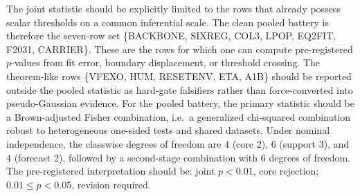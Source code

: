 \documentclass[11pt]{article}
\begin{document}
The joint statistic should be explicitly limited to the rows that already
possess scalar thresholds on a common inferential scale. The clean pooled
battery is therefore the seven-row set
\{BACKBONE, SIXREG, COL3, LPOP, EQ2FIT, F2031, CARRIER\}. These are the
rows for which one can compute pre-registered $p$-values from fit error,
boundary displacement, or threshold crossing. The theorem-like rows
\{VFEXO, HUM, RESETENV, ETA, A1B\} should be reported outside the pooled
statistic as hard-gate falsifiers rather than force-converted into
pseudo-Gaussian evidence. For the pooled battery, the primary statistic
should be a Brown-adjusted Fisher combination, i.e.\ a generalized
chi-squared combination robust to heterogeneous one-sided tests and shared
datasets. Under nominal independence, the classwise degrees of freedom are
$4$ (core $2$), $6$ (support $3$), and $4$ (forecast $2$), followed by a
second-stage combination with $6$ degrees of freedom. The pre-registered
interpretation should be: joint $p<0.01$, core rejection;
$0.01\le p<0.05$, revision required.

\end{document}
